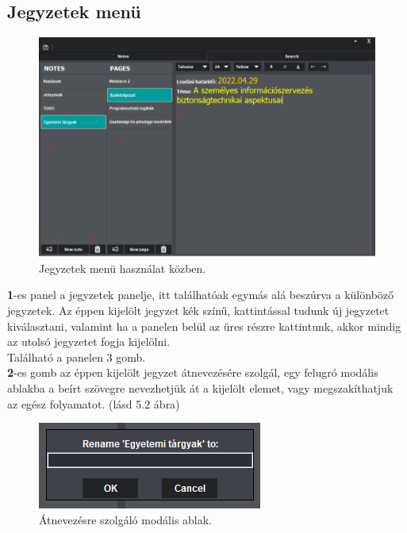 
\subsection{Jegyzetek menü}

\begin{figure}[h]
	\centering
	\includegraphics[scale=0.7]{images/doc_1.png}
	\caption{Jegyzetek menü használat közben.}
	\label{fig:menu_notes_2}
\end{figure}

\vspace{5pt} \noindent \textbf{1}-es panel a jegyzetek panelje, itt találhatóak egymás alá beszúrva a különböző jegyzetek. Az éppen kijelölt jegyzet kék színű, kattintással tudunk új jegyzetet kiválasztani, valamint ha a panelen belül az üres részre kattintunk, akkor mindig az utolsó jegyzetet fogja kijelölni.
\newline \\ Található a panelen 3 gomb. 
\vspace{5pt} \\ \textbf{2}-es gomb az éppen kijelölt jegyzet átnevezésére szolgál, egy felugró modális ablakba a beírt szövegre nevezhetjük át a kijelölt elemet, vagy megszakíthatjuk az egész folyamatot. (lásd 5.2 ábra)

\begin{figure}[h]
	\centering
	\includegraphics[scale=0.7]{images/doc_2.png}
	\caption{Átnevezésre szolgáló modális ablak.}
	\label{fig:menu_notes_rename}
\end{figure}

